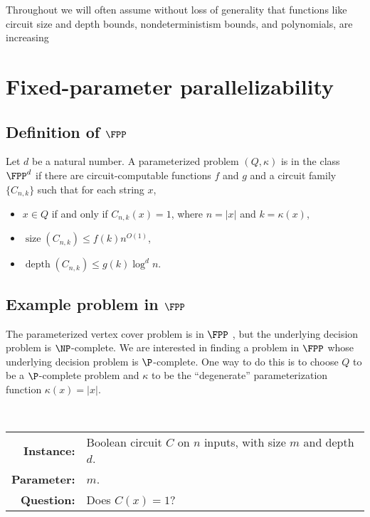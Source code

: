 \documentclass{article}
\newcommand{\dash}{\textnormal{-}}
\DeclareMathOperator{\depth}{depth}
\DeclareMathOperator{\size}{size}
\begin{document}
Throughout we will often assume without loss of generality that functions like circuit size and depth bounds, nondeterministism bounds, and polynomials, are increasing

\section{Fixed-parameter parallelizability}
\label{sec:pcompletefpp}

\subsection{Definition of \texorpdfstring{$\FPP$}{FPP}}

\begin{definition}[$\FPP^d$]
  Let $d$ be a natural number.
  A parameterized problem $(Q, \kappa)$ is in the class $\FPP^d$ if there are circuit-computable functions $f$ and $g$ and a circuit family $\{C_{n, k}\}$ such that for each string $x$,
  \begin{itemize}
  \item $x \in Q$ if and only if $C_{n, k}(x) = 1$, where $n = |x|$ and $k = \kappa(x)$,
  \item $\size(C_{n, k}) \leq f(k) n^{O(1)}$,
  \item $\depth(C_{n, k}) \leq g(k) \log^d n$.
  \end{itemize}
\end{definition}

\subsection{Example problem in \texorpdfstring{$\FPP$}{FPP}}

The parameterized vertex cover problem is in $\FPP$ \autocite{bst15}, but the underlying decision problem is $\NP$-complete.
We are interested in finding a problem in $\FPP$ whose underlying decision problem is $\P$-complete.
One way to do this is to choose $Q$ to be a $\P$-complete problem and $\kappa$ to be the ``degenerate'' parameterization function $\kappa(x) = |x|$.

\begin{definition}[$p \dash s \dash \textsc{Circuit Evaluation}$]
  \mbox{} \\
  \begin{tabular}{r p{9.2cm}}
    \textbf{Instance:} & Boolean circuit $C$ on $n$ inputs, with size $m$ and depth $d$. \\
    \textbf{Parameter:} & $m$. \\
    \textbf{Question:} & Does $C(x) = 1$?
  \end{tabular}
\end{definition}
\end{document}
